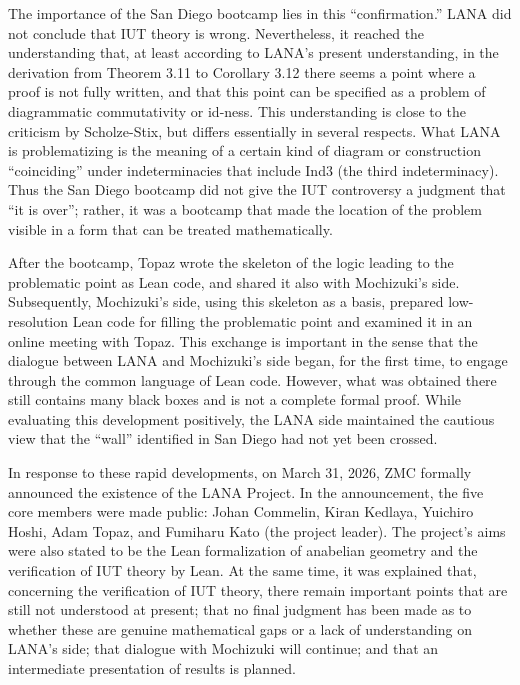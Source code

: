 \documentclass[12pt, reqno, a4paper]{amsart}
\begin{document}
The importance of the San Diego bootcamp lies in this ``confirmation.'' LANA did not conclude that IUT theory is wrong. Nevertheless, it reached the understanding that, at least according to LANA's present understanding, in the derivation from Theorem 3.11 to Corollary 3.12 there seems a point where a proof is not fully written, and that this point can be specified as a problem of diagrammatic commutativity or id-ness. This understanding is close to the criticism by Scholze-Stix, but differs essentially in several respects. What LANA is problematizing is the meaning of a certain kind of diagram or construction ``coinciding'' under indeterminacies that include Ind3 (the third indeterminacy). Thus the San Diego bootcamp did not give the IUT controversy a judgment that ``it is over''; rather, it was a bootcamp that made the location of the problem visible in a form that can be treated mathematically.

After the bootcamp, Topaz wrote the skeleton of the logic leading to the problematic point as Lean code, and shared it also with Mochizuki's side. Subsequently, Mochizuki's side, using this skeleton as a basis, prepared low-resolution Lean code for filling the problematic point and examined it in an online meeting with Topaz. This exchange is important in the sense that the dialogue between LANA and Mochizuki's side began, for the first time, to engage through the common language of Lean code. However, what was obtained there still contains many black boxes and is not a complete formal proof. While evaluating this development positively, the LANA side maintained the cautious view that the ``wall'' identified in San Diego had not yet been crossed.

In response to these rapid developments, on March 31, 2026, ZMC formally announced the existence of the LANA Project. In the announcement, the five core members were made public: Johan Commelin, Kiran Kedlaya, Yuichiro Hoshi, Adam Topaz, and Fumiharu Kato (the project leader). The project's aims were also stated to be the Lean formalization of anabelian geometry and the verification of IUT theory by Lean. At the same time, it was explained that, concerning the verification of IUT theory, there remain important points that are still not understood at present; that no final judgment has been made as to whether these are genuine mathematical gaps or a lack of understanding on LANA's side; that dialogue with Mochizuki will continue; and that an intermediate presentation of results is planned.
\end{document}
